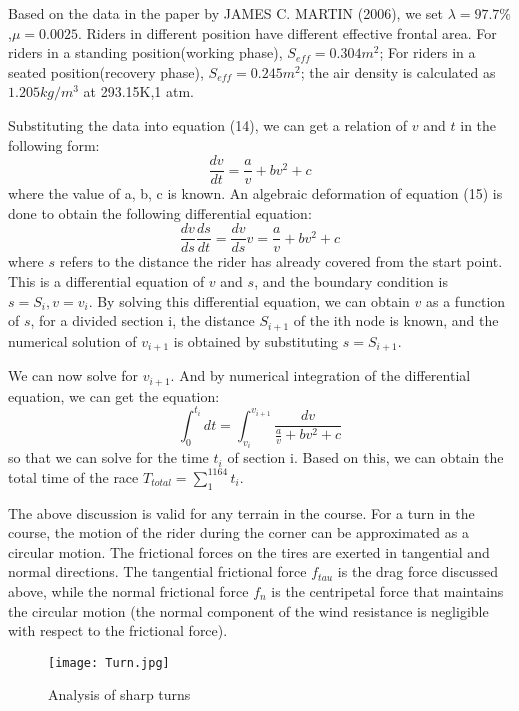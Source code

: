 \documentclass{mcmthesis}
\begin{document}
Based on the data in the paper by JAMES C. MARTIN (2006), we set $\lambda=97.7\%$,$\mu=0.0025$. Riders in different position have different effective frontal area. For riders in a standing position(working phase), $S_{eff}=0.304m^2$; For riders in a seated position(recovery phase), $S_{eff}=0.245m^2$; the air density is calculated as $1.205kg/m^3$ at 293.15K,1 atm. 

Substituting the data into equation (14), we can get a relation of $v$ and $t$ in the following form:
\begin{equation}
	\frac{dv}{dt}=\frac{a}{v}+bv^2+c
\end{equation}
where the value of a, b, c is known. An algebraic deformation of equation (15) is done to obtain the following differential equation:
\begin{equation}
	\frac{dv}{ds}\frac{ds}{dt}=\frac{dv}{ds}v=\frac{a}{v}+bv^2+c
\end{equation}
where $s$ refers to the distance the rider has already covered from the start point. This is a differential equation of $v$ and $s$, and the boundary condition is $s=S_i, v=v_i$. By solving this differential equation, we can obtain $v$ as a function of $s$, for a divided section i, the distance $S_{i+1}$ of the ith node is known, and the numerical solution of $v_{i+1}$ is obtained by substituting $s=S_{i+1}$.

We can now solve for $v_{i+1}$. And by numerical integration of the differential equation, we can get the equation:
\begin{equation}
	\int_{0}^{t_i} dt=\int_{v_i}^{v_{i+1}} \frac{dv}{\frac{a}{v}+bv^2+c}
\end{equation}
so that we can solve for the time $t_i$ of section i. Based on this, we can obtain the total time of the race $T_{total}=\sum_{1}^{1164}t_i$.

The above discussion is valid for any terrain in the course. For a turn in the course, the motion of the rider during the corner can be approximated as a circular motion. The frictional forces on the tires are exerted in tangential and normal directions. The tangential frictional force $f_{tau}$ is the drag force discussed above, while the normal frictional force $f_n$ is the centripetal force that maintains the circular motion (the normal component of the wind resistance is negligible with respect to the frictional force).
\begin{figure}[h]
	\centering
	\texttt{[image: Turn.jpg]}
	\caption{Analysis of sharp turns} 
\end{figure}
\end{document}
